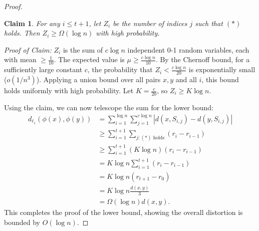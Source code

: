 \documentclass[a4paper]{article}
\newtheorem{claim}[thm]{Claim}
\begin{document}
\begin{proof}
    \begin{claim}
        For any $i \leq t+1$, let $Z_i$ be the number of indices $j$ such that $(*)$ holds. Then $Z_i \geq \Omega(\log n)$ with high probability.
    \end{claim}
    \noindent\textit{Proof of Claim:} $Z_i$ is the sum of $c\log n$ independent 0-1 random variables, each with mean $\geq \frac{1}{10}$. The expected value is $\mu \geq \frac{c\log n}{10}$. By the Chernoff bound, for a sufficiently large constant $c$, the probability that $Z_i < \frac{c\log n}{20}$ is exponentially small ($o(1/n^3)$). Applying a union bound over all pairs $x,y$ and all $i$, this bound holds uniformly with high probability. Let $K = \frac{c}{20}$, so $Z_i \geq K\log n$.

    \medskip\noindent
    Using the claim, we can now telescope the sum for the lower bound:
    \begin{align*}
        d_{\ell_1}(\phi(x),\phi(y)) &= \sum_{i=1}^{\log n}\sum_{j=1}^{c\log n} \left| d(x,S_{i,j}) - d(y,S_{i,j}) \right| \\
        &\geq \sum_{i=1}^{t+1} \sum_{j : (*)\text{ holds}} (r_i - r_{i-1}) \\
        &\geq \sum_{i=1}^{t+1} (K\log n) (r_i - r_{i-1}) \\
        &= K\log n \sum_{i=1}^{t+1} (r_i - r_{i-1}) \\
        &= K\log n (r_{t+1} - r_0) \\
        &= K\log n \frac{d(x,y)}{3} \\
        &= \Omega(\log n) d(x,y)
    .\end{align*}
    This completes the proof of the lower bound, showing the overall distortion is bounded by $O(\log n)$.
\end{proof}
\newpage
\end{document}

